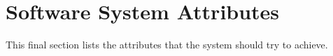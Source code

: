 \section{Software System Attributes}

This final section lists the attributes that the system should try to achieve.

 
 
  
 
 